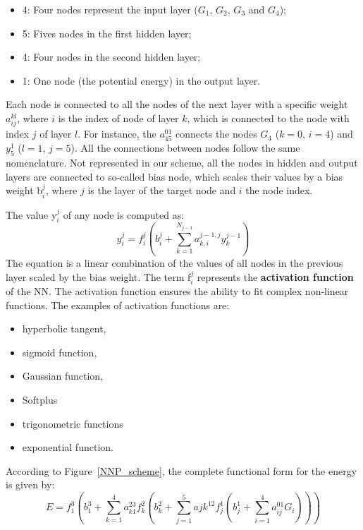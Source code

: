 \documentclass[12pt]{article}
\begin{document}
\begin{itemize}
    \item 4: Four nodes represent the input layer ($G_1$, $G_2$, $G_3$ and $G_4$);
    \item 5: Fives nodes in the first hidden layer;
    \item 4: Four nodes in the second hidden layer;
    \item 1: One node (the potential energy) in the output layer.
\end{itemize}
Each node is connected to all the nodes of the next layer with a specific weight \textbf{$a_{ij}^{kl}$}, where $i$ is the index of node of layer $k$, which is connected to the node with index $j$ of layer $l$. For instance, the $a_{45}^{01}$ connects the nodes $G_4$ ($k = 0$, $i=4$) and $y_5^1$ ($l=1$,  $j=5$). All the connections between nodes follow the same nomenclature. Not represented in our scheme, all the nodes in hidden and output layers are connected to so-called bias node, which scales their values by a bias weight b$_i^j$, where $j$ is the layer of the target node and $i$ the node index. 

The value y$_i^j$ of any node is computed as:
\begin{equation}
    y_i^{j} = f_i^j(b_i^j + \sum_{k=1}^{N_{j-1}} a_{k,i}^{j-1,j} y_k^{j-1})
\end{equation}
The equation is a linear combination of the values of all nodes in the previous layer scaled by the bias weight. The term f$_i^j$ represents the \textbf{activation function} of the NN. The activation function ensures the ability to fit complex non-linear functions. The examples of activation functions are:
\begin{itemize}
    \item hyperbolic tangent,
    \item sigmoid function,
    \item Gaussian function,
    \item Softplus
    \item trigonometric functions
    \item exponential function.
\end{itemize}
According to Figure~\ref{NNP_scheme}, the complete functional form for the energy is given by:
\begin{equation}
    E = f_1^3(b_1^3 + \sum_{k=1}^4 a_{k1}^{23} f_k^2 (b_k^2 + \sum_{j=1}^5 a{jk}^{12} f_j^1 (b_j^1 + \sum_{i=1}^4 a_{ij}^{01} G_i)))
\end{equation}
\end{document}
